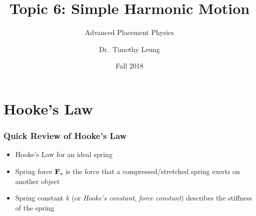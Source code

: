 \documentclass[12pt,compress,aspectratio=169]{beamer}
\title{Topic 6: Simple Harmonic Motion}
\subtitle{Advanced Placement Physics}
\author[TML]{Dr.\ Timothy Leung}
\institute{Olympiads School}
\date{Fall 2018}
\newcommand{\mb}[1]{\ensuremath\mathbf{#1}}
\newcommand{\eq}[2]{\vspace{#1}{\Large\begin{displaymath}#2\end{displaymath}}}
\begin{document}
\begin{frame}
  \maketitle
\end{frame}

%
%


\section{Hooke's Law}
\begin{frame}
  \frametitle{Quick Review of Hooke's Law}
  \begin{itemize}
  \item Hooke's Law for an ideal spring

    \eq{-.2in}{
      \boxed{\mb{F}_s=-k\mb{x}}
    }
  \item Spring force $\mb{F}_s$ is the force that a compressed/stretched
    spring exerts on another object
  \item Spring constant $k$ (or \emph{Hooke's constant},
    \emph{force constant}) describes the stiffness of the spring
  \end{itemize}
\end{frame}
\end{document}
